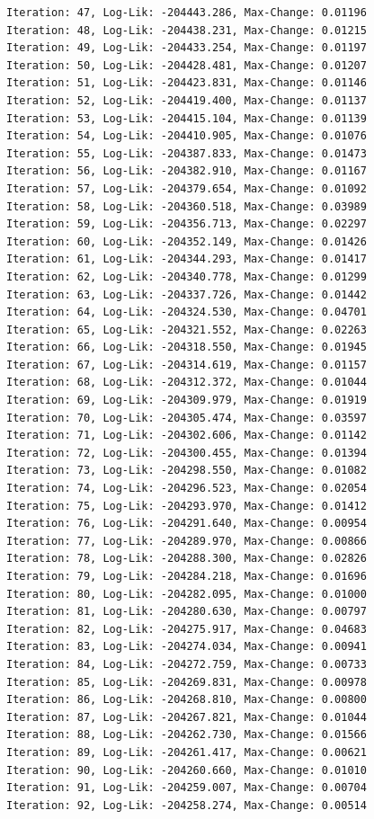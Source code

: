 \documentclass[
  letterpaper,
  DIV=11,
  numbers=noendperiod]{scrreport}
\begin{document}
\begin{verbatim}
Iteration: 47, Log-Lik: -204443.286, Max-Change: 0.01196
Iteration: 48, Log-Lik: -204438.231, Max-Change: 0.01215
Iteration: 49, Log-Lik: -204433.254, Max-Change: 0.01197
Iteration: 50, Log-Lik: -204428.481, Max-Change: 0.01207
Iteration: 51, Log-Lik: -204423.831, Max-Change: 0.01146
Iteration: 52, Log-Lik: -204419.400, Max-Change: 0.01137
Iteration: 53, Log-Lik: -204415.104, Max-Change: 0.01139
Iteration: 54, Log-Lik: -204410.905, Max-Change: 0.01076
Iteration: 55, Log-Lik: -204387.833, Max-Change: 0.01473
Iteration: 56, Log-Lik: -204382.910, Max-Change: 0.01167
Iteration: 57, Log-Lik: -204379.654, Max-Change: 0.01092
Iteration: 58, Log-Lik: -204360.518, Max-Change: 0.03989
Iteration: 59, Log-Lik: -204356.713, Max-Change: 0.02297
Iteration: 60, Log-Lik: -204352.149, Max-Change: 0.01426
Iteration: 61, Log-Lik: -204344.293, Max-Change: 0.01417
Iteration: 62, Log-Lik: -204340.778, Max-Change: 0.01299
Iteration: 63, Log-Lik: -204337.726, Max-Change: 0.01442
Iteration: 64, Log-Lik: -204324.530, Max-Change: 0.04701
Iteration: 65, Log-Lik: -204321.552, Max-Change: 0.02263
Iteration: 66, Log-Lik: -204318.550, Max-Change: 0.01945
Iteration: 67, Log-Lik: -204314.619, Max-Change: 0.01157
Iteration: 68, Log-Lik: -204312.372, Max-Change: 0.01044
Iteration: 69, Log-Lik: -204309.979, Max-Change: 0.01919
Iteration: 70, Log-Lik: -204305.474, Max-Change: 0.03597
Iteration: 71, Log-Lik: -204302.606, Max-Change: 0.01142
Iteration: 72, Log-Lik: -204300.455, Max-Change: 0.01394
Iteration: 73, Log-Lik: -204298.550, Max-Change: 0.01082
Iteration: 74, Log-Lik: -204296.523, Max-Change: 0.02054
Iteration: 75, Log-Lik: -204293.970, Max-Change: 0.01412
Iteration: 76, Log-Lik: -204291.640, Max-Change: 0.00954
Iteration: 77, Log-Lik: -204289.970, Max-Change: 0.00866
Iteration: 78, Log-Lik: -204288.300, Max-Change: 0.02826
Iteration: 79, Log-Lik: -204284.218, Max-Change: 0.01696
Iteration: 80, Log-Lik: -204282.095, Max-Change: 0.01000
Iteration: 81, Log-Lik: -204280.630, Max-Change: 0.00797
Iteration: 82, Log-Lik: -204275.917, Max-Change: 0.04683
Iteration: 83, Log-Lik: -204274.034, Max-Change: 0.00941
Iteration: 84, Log-Lik: -204272.759, Max-Change: 0.00733
Iteration: 85, Log-Lik: -204269.831, Max-Change: 0.00978
Iteration: 86, Log-Lik: -204268.810, Max-Change: 0.00800
Iteration: 87, Log-Lik: -204267.821, Max-Change: 0.01044
Iteration: 88, Log-Lik: -204262.730, Max-Change: 0.01566
Iteration: 89, Log-Lik: -204261.417, Max-Change: 0.00621
Iteration: 90, Log-Lik: -204260.660, Max-Change: 0.01010
Iteration: 91, Log-Lik: -204259.007, Max-Change: 0.00704
Iteration: 92, Log-Lik: -204258.274, Max-Change: 0.00514

\end{verbatim}
\end{document}
